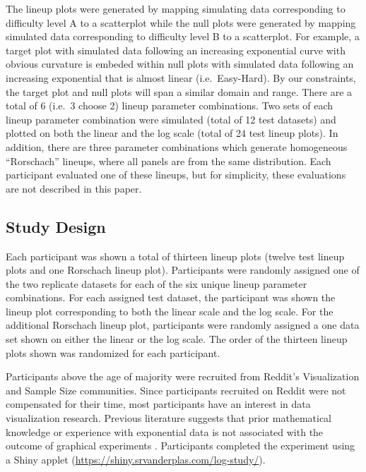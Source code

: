 \documentclass[]{interact}
\theoremstyle{plain}%
\theoremstyle{definition}
\theoremstyle{remark}
\begin{document}
The lineup plots were generated by mapping simulating data corresponding
to difficulty level A to a scatterplot while the null plots were
generated by mapping simulated data corresponding to difficulty level B
to a scatterplot. For example, a target plot with simulated data
following an increasing exponential curve with obvious curvature is
embeded within null plots with simulated data following an increasing
exponential that is almost linear (i.e.~Easy-Hard). By our constraints,
the target plot and null plots will span a similar domain and range.
There are a total of 6 (i.e.~3 choose 2) lineup parameter combinations.
Two sets of each lineup parameter combination were simulated (total of
12 test datasets) and plotted on both the linear and the log scale
(total of 24 test lineup plots). In addition, there are three parameter
combinations which generate homogeneous ``Rorschach'' lineups, where all
panels are from the same distribution. Each participant evaluated one of
these lineups, but for simplicity, these evaluations are not described
in this paper.

\hypertarget{study-design}{%
\subsection{Study Design}\label{study-design}}

Each participant was shown a total of thirteen lineup plots (twelve test
lineup plots and one Rorschach lineup plot). Participants were randomly
assigned one of the two replicate datasets for each of the six unique
lineup parameter combinations. For each assigned test dataset, the
participant was shown the lineup plot corresponding to both the linear
scale and the log scale. For the additional Rorschach lineup plot,
participants were randomly assigned a one data set shown on either the
linear or the log scale. The order of the thirteen lineup plots shown
was randomized for each participant.

Participants above the age of majority were recruited from Reddit's
Visualization and Sample Size communities. Since participants recruited
on Reddit were not compensated for their time, most participants have an
interest in data visualization research. Previous literature suggests
that prior mathematical knowledge or experience with exponential data is
not associated with the outcome of graphical experiments
\citep{vanderplasSpatialReasoningData2016}. Participants completed the
experiment using a Shiny applet
(\url{https://shiny.srvanderplas.com/log-study/}).
\end{document}
